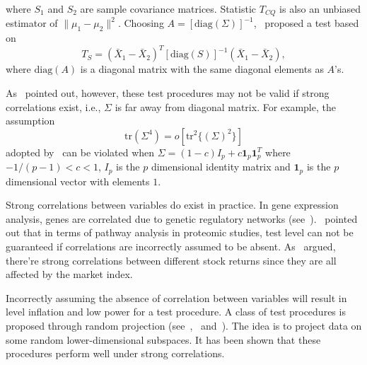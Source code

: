 \documentclass[review]{elsarticle}
\theoremstyle{plain}
\theoremstyle{definition}
\theoremstyle{remark}
\begin{document}
where $S_1$ and $S_2$ are sample covariance matrices. Statistic $T_{CQ}$ 
is also an unbiased estimator of $\|\mu_1-\mu_2\|^2$. Choosing $A={[\mathrm{diag}(\Sigma)]}^{-1}$,~\cite{Srivastava2008A} proposed a test based on
\begin{equation*}
    T_{S}={(\bar{X}_1-\bar{X}_2)}^T {[\mathrm{diag}(S)]}^{-1}(\bar{X}_1-\bar{X}_2),
\end{equation*}
where $\textrm{diag} (A)$ is a diagonal matrix with the same diagonal elements as $A$'s.

As~\cite{Ma2015A} pointed out, however, these test procedures may not be valid if strong correlations exist, i.e., $\Sigma$ is far away from diagonal matrix. For example, the assumption 
\begin{equation}\label{chenscondition}
\mathrm{tr}(\Sigma^4)=o[\mathrm{tr}^2\{{(\Sigma)}^2\}]
\end{equation}
adopted by~\cite{Chen2010A} can be violated when $\Sigma=(1-c)I_p+c\bm{1}_p \bm{1}_p^T$ where $-{1}/{(p-1)}<c<1$, $I_p$ is the $p$ dimensional identity matrix and $\bm{1}_p$ is the $p$ dimensional vector  with
elements $1$. 

Strong correlations between variables do exist in practice. In gene expression analysis, genes are correlated due to genetic regulatory networks (see~\cite{Thulin2014A}).~\cite{Chen2011A} pointed out that in terms of pathway analysis in proteomic studies,  test level can not be guaranteed if correlations are incorrectly assumed to be absent.
 As~\cite{Ma2015A} argued, there're strong correlations between different stock returns since they are all affected by the market index.

Incorrectly assuming the absence of correlation between variables will result in level inflation and low power for a test procedure. A class of test procedures is proposed through random projection (see~\cite{Lopes2015A},~\cite{Thulin2014A} and~\cite{Srivastava2014RAPTT}). The idea is to project data on some random lower-dimensional subspaces. It has been shown that these
procedures perform well under strong correlations. 
\end{document}
